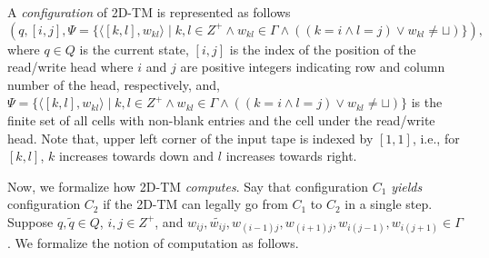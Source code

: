 \documentclass[12pt]{article}
\begin{document}
A \emph{configuration} of 2D-TM is represented as follows
\[\left(q, [i, j], \Psi = \{ \langle[k, l], w_{kl} \rangle \mid  k, l \in Z^{+} \land w_{kl} \in \Gamma \land ((k = i \land l = j) \lor w_{kl} \neq \sqcup) \} \right),\]
where $q \in Q$ is the current state, $[i, j]$ is the index of the position of the read/write head where $i$ and $j$ are positive integers indicating row and column number of the head, respectively, and, $\Psi = \{ \langle[k, l], w_{kl} \rangle \mid  k, l \in Z^{+} \land w_{kl} \in \Gamma \land ((k = i \land l = j) \lor w_{kl} \neq \sqcup) \}$ is the finite set of all cells with non-blank entries and the cell under the read/write head. Note that, upper left corner of the input tape is indexed by $[1, 1]$, i.e., for $[k, l]$, $k$ increases towards down and $l$ increases towards right.

Now, we formalize how 2D-TM \emph{computes}. Say that configuration $C_1$ \emph{yields} configuration $C_2$ if the 2D-TM can legally go from $C_1$ to $C_2$ in a single step. Suppose $q, \tilde{q} \in Q$, $i, j \in Z^{+}$, and $w_{ij}, \tilde{w_{ij}}, w_{(i-1)j}, w_{(i+1)j}, w_{i(j-1)}, w_{i(j+1)} \in \Gamma$. We formalize the notion of computation as follows.

\
\end{document}
